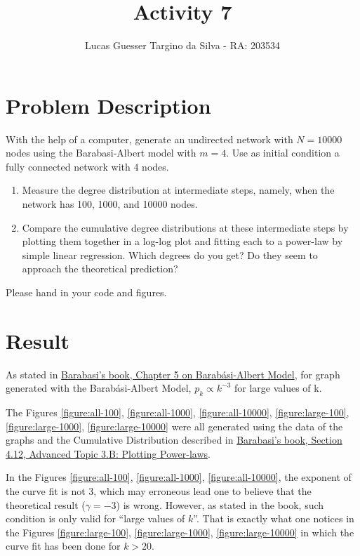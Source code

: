 \documentclass{article}
\title{Activity 7}
\author{Lucas Guesser Targino da Silva - RA: 203534}
\begin{document}
\maketitle

\section{Problem Description}

With the help of a computer, generate an undirected network with $N = 10000$ nodes using the Barabasi-Albert model with $m = 4$. Use as initial condition a fully connected network with $4$ nodes.

\begin{enumerate}
    \item Measure the degree distribution at intermediate steps, namely, when the network has 100, 1000, and 10000 nodes.
    \item Compare the cumulative degree distributions at these intermediate steps by plotting them together in a log-log plot and fitting each to a power-law by simple linear regression. Which degrees do you get?  Do they seem to approach the theoretical prediction?
\end{enumerate}

Please hand in your code and figures.

\section{Result}

As stated in \href{http://networksciencebook.com/chapter/5}{Barabasi's book, Chapter 5 on Barabási-Albert Model}, for graph generated with the Barabási-Albert Model, $p_k \propto k^{-3}$ for large values of k.

The Figures \ref{figure:all-100}, \ref{figure:all-1000}, \ref{figure:all-10000}, \ref{figure:large-100}, \ref{figure:large-1000}, \ref{figure:large-10000} were all generated using the data of the graphs and the Cumulative Distribution described in \href{http://networksciencebook.com/chapter/4#advanced-b}{Barabasi's book, Section 4.12, Advanced Topic 3.B: Plotting Power-laws}.

In the Figures \ref{figure:all-100}, \ref{figure:all-1000}, \ref{figure:all-10000}, the exponent of the curve fit is not 3, which may erroneous lead one to believe that the theoretical result ($\gamma = -3$) is wrong. However, as stated in the book, such condition is only valid for ``large values of $k$''. That is exactly what one notices in the Figures \ref{figure:large-100}, \ref{figure:large-1000}, \ref{figure:large-10000} in which the curve fit has been done for $k > 20$.
\end{document}
